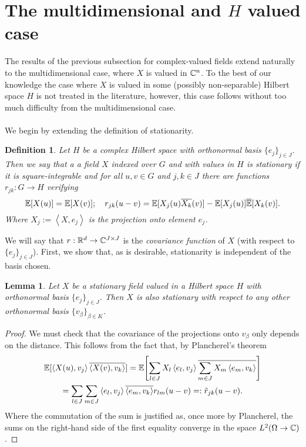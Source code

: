 \documentclass[12pt]{article}
\newtheorem{lemma}{Lemma}
\newtheorem{definition}{Definition}
\newcommand{\br}[1]{\left\langle#1\right\rangle}
\begin{document}
\section{The multidimensional and $H$ valued case}
The results of the previous subsection for complex-valued fields extend naturally to the multidimensional case, where $X$ is valued in $\mathbb{C}^n$. To the best of our knowledge the case where $X$ is valued in some (possibly non-separable) Hilbert space $H$ is not treated in the literature, however, this case follows without too much difficulty from the multidimensional case. \\
\\
We begin by extending the definition of  stationarity.

\begin{definition}
    Let $H$ be a complex Hilbert space with orthonormal basis $\{e_j\}_{j\in J}$. Then we say that a a field $X$  indexed over $G$ and with values in $H$ is stationary if it is square-integrable and for all $u,v \in G$ and $j, k\in J$ there are functions $r_{jk}: G\to H$ verifying
    \begin{equation*}
        \mathbb{E}[X(u)]=\mathbb{E}[X(v)];\quad r_{jk}(u-v)=\mathbb{E}[{X_{j}(u)\overline{X_k}(v)}]-\mathbb{E}[{X_{j}(u)]\overline{\mathbb{E}}[{X_k}(v)}].
    \end{equation*}
    Where $X_j:=\br{X,e_j}$ is the projection onto element $e_j$.
\end{definition}
We will say that $r:{\mathbb R}^d\to\mathbb{C}^{J\times J}$ is the \emph{covariance function} of $X$ (with respect to $\{e_j\}_{j\in J}$). First, we show that, as is desirable, stationarity is independent of the basis chosen.
\begin{lemma}
    Let $X$ be a stationary field valued in a Hilbert space $H$ with orthonormal basis $\{e_j\}_{j\in J}$. Then $X$ is also stationary with respect to any other orthonormal basis $\{v_\beta\}_{\beta\in K}$.
\end{lemma}
\begin{proof}
    We must check that the covariance of the projections onto $v_\beta$ only depends on the distance. This follows from the fact that, by Plancherel's theorem
    \begin{multline*}
        \E[\br{X(u),v_j}\overline{\br{X(v),v_k}}]=\E\qty[\sum_{l \in  J}X_l\br{e_l,v_j}\overline{\sum_{m\in J}X_m \br{e_m,v_k} }]\\= \sum_{l \in  J}\sum_{m \in  J} \br{e_l,v_j} \overline{\br{e_m,v_k}}r_{l m}(u-v)=:\tilde{r}_{ j k }(u-v) .
    \end{multline*}
    Where the commutation of the sum is justified  as, once more by Plancherel, the sums on the right-hand side of the first equality  converge in the space $L^2(\Omega\to\mathbb{C})$.
\end{proof}
\end{document}
